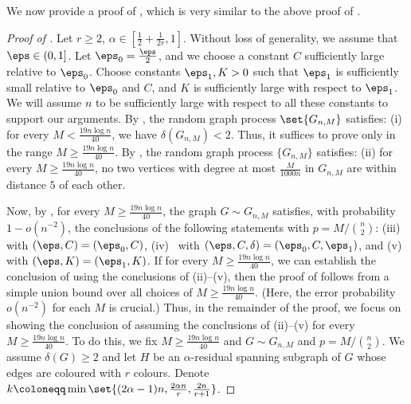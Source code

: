 \documentclass[10pt,a4paper,reqno]{amsart}
\begin{document}
We now provide a proof of , which is very similar to the above proof of . 
\hittingtime*
\begin{proof}[Proof of ]
Let $r \geq 2$, $\alpha \in [\frac{1}{2} + \frac{1}{2r}, 1]$. Without loss of generality, we assume that $\eps \in (0,1]$. Let $\eps_0 = \frac{\eps}{2}$, and we choose a constant $C$ sufficiently large relative to $\eps_0$. Choose constants $\eps_1, K >0$ such that $\eps_1$ is sufficiently small relative to $\eps_0$ and $C$, and $K$ is sufficiently large with respect to $\eps_1$. We will assume $n$ to be sufficiently large with respect to all these constants to support our arguments. By , \whp the random graph process $\set{G_{n,M}}$ satisfies: (i) for every $M < \frac{19n \log n}{40}$, we have $\delta(G_{n, M}) < 2$. Thus, it suffices to prove  only in the range $M\ge \frac{19n \log n}{40}$. By , \whp the random graph process $\{G_{n,M}\}$ satisfies: (ii) for every $M \ge \frac{19n\log{n}}{40}$, no two vertices with degree at most $\frac{M}{1000n}$ in $G_{n,M}$ are within distance $5$ of each other.

Now, by , for every $M\ge \frac{19n\log n}{40}$, the graph $G\sim G_{n,M}$ satisfies, with probability $1-o(n^{-2})$, the conclusions of the following statements with $p= M/\binom{n}{2}$: (iii)~ with $(\eps, C) = (\eps_0, C)$, (iv)~ with $(\eps, C, \delta) = (\eps_0, C, \eps_1)$, and (v)~ with $(\eps, K) = (\eps_1, K)$. If for every $M\ge \frac{19n\log n}{40}$, we can establish the conclusion of  using the conclusions of (ii)--(v), then the proof of  follows from a simple union bound over all choices of $M\ge \frac{19n\log n}{40}$. (Here, the error probability $o(n^{-2})$ for each $M$ is crucial.) Thus, in the remainder of the proof, we focus on showing the conclusion of  assuming the conclusions of (ii)--(v) for every $M\ge \frac{19n\log n}{40}$.
To do this, we fix $M\ge \frac{19n\log n}{40}$ and $G\sim G_{n,M}$ and $p=M/\binom{n}{2}$. We assume $\delta(G)\ge 2$ and let $H$ be an $\alpha$-residual spanning subgraph of $G$ whose edges are coloured with $r$ colours. 
Denote $k\coloneqq \min\set{(2\alpha - 1)n, \frac{2\alpha n}{r}, \frac{2n}{r+1}}$.


\end{proof}
\end{document}
